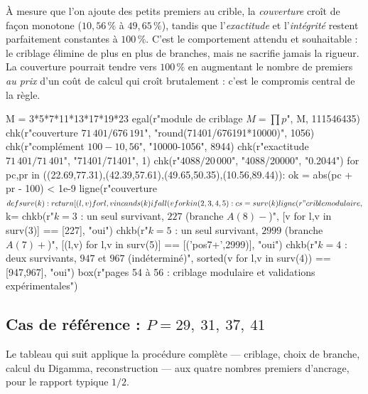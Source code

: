 \documentclass[11pt,a4paper]{article}
\begin{document}
\vspace{0.3cm}
\begin{boitenote}
À mesure que l'on ajoute des petits premiers au crible, la
\emph{couverture} croît de façon monotone ($10{,}56\,\%$ à $49{,}65\,\%$),
tandis que l'\emph{exactitude} et l'\emph{intégrité} restent
parfaitement constantes à $100\,\%$. C'est le comportement attendu et
souhaitable : le criblage élimine de plus en plus de branches, mais ne
sacrifie jamais la rigueur. La couverture pourrait tendre vers $100\,\%$
en augmentant le nombre de premiers \emph{au prix} d'un coût de calcul
qui croît brutalement : c'est le compromis central de la règle.
\end{boitenote}


\begin{pycode}
M = 3*5*7*11*13*17*19*23
egal(r"module de criblage $M=\prod p$", M, 111546435)
chk(r"couverture $71\,401/676\,191$", "round(71401/676191*10000)", 1056)
chk(r"complément $100-10{,}56$", "10000-1056", 8944)
chk(r"exactitude $71\,401/71\,401$", "71401/71401", 1)
chk(r"$4088/20\,000$", "4088/20000", "0.2044")
for pc,pr in ((22.69,77.31),(42.39,57.61),(49.65,50.35),(10.56,89.44)):
    ok = abs(pc + pr - 100) < 1e-9
    ligne(r"couverture $%
def surv(k):
    return [(l,v) for l,v in cands(k) if all(v %
for k in (2,3,4,5):
    cs = surv(k)
    ligne(r"crible modulaire, $k=%
chkb(r"$k=3$ : un seul survivant, $227$ (branche $A(8)-$)", [v for l,v in surv(3)] == [227], "oui")
chkb(r"$k=5$ : un seul survivant, $2999$ (branche $A(7)+$)", [(l,v) for l,v in surv(5)] == [('pos7+',2999)], "oui")
chkb(r"$k=4$ : deux survivants, $947$ et $967$ (indéterminé)", sorted(v for l,v in surv(4)) == [947,967], "oui")
box(r"pages 54 à 56 : criblage modulaire et validations expérimentales")
\end{pycode}

\subsection{Cas de référence : \texorpdfstring{$P = 29,\ 31,\ 37,\ 41$}{P = 29, 31, 37, 41}}
Le tableau qui suit applique la procédure complète --- criblage, choix
de branche, calcul du Digamma, reconstruction --- aux quatre nombres
premiers d'ancrage, pour le rapport typique $1/2$.
\end{document}
